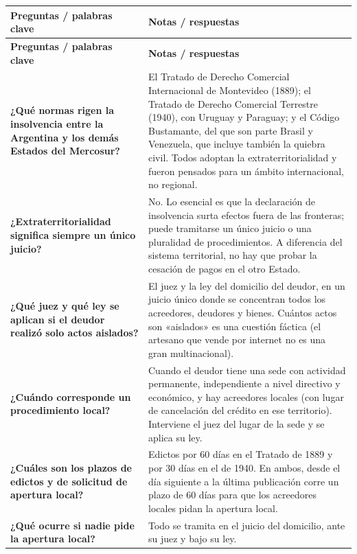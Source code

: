 \documentclass[12pt,oneside]{book}
\begin{document}
\begin{longtable}{>{\raggedright\arraybackslash}p{} >{\raggedright\arraybackslash}p{}}
\toprule
\textbf{Preguntas / palabras clave} & \textbf{Notas / respuestas} \\
\midrule
\endfirsthead
\toprule
\textbf{Preguntas / palabras clave} & \textbf{Notas / respuestas} \\
\midrule
\endhead
\bottomrule
\endlastfoot

\textbf{¿Qué normas rigen la insolvencia entre la Argentina y los demás Estados del Mercosur?} &
El Tratado de Derecho Comercial Internacional de Montevideo (1889); el Tratado de Derecho Comercial Terrestre (1940), con Uruguay y Paraguay; y el Código Bustamante, del que son parte Brasil y Venezuela, que incluye también la quiebra civil. Todos adoptan la extraterritorialidad y fueron pensados para un ámbito internacional, no regional. \\

\textbf{¿Extraterritorialidad significa siempre un único juicio?} &
No. Lo esencial es que la declaración de insolvencia surta efectos fuera de las fronteras; puede tramitarse un único juicio o una pluralidad de procedimientos. A diferencia del sistema territorial, no hay que probar la cesación de pagos en el otro Estado. \\

\textbf{¿Qué juez y qué ley se aplican si el deudor realizó solo actos aislados?} &
El juez y la ley del domicilio del deudor, en un juicio único donde se concentran todos los acreedores, deudores y bienes. Cuántos actos son «aislados» es una cuestión fáctica (el artesano que vende por internet no es una gran multinacional). \\

\textbf{¿Cuándo corresponde un procedimiento local?} &
Cuando el deudor tiene una sede con actividad permanente, independiente a nivel directivo y económico, y hay acreedores locales (con lugar de cancelación del crédito en ese territorio). Interviene el juez del lugar de la sede y se aplica su ley. \\

\textbf{¿Cuáles son los plazos de edictos y de solicitud de apertura local?} &
Edictos por 60 días en el Tratado de 1889 y por 30 días en el de 1940. En ambos, desde el día siguiente a la última publicación corre un plazo de 60 días para que los acreedores locales pidan la apertura local. \\

\textbf{¿Qué ocurre si nadie pide la apertura local?} &
Todo se tramita en el juicio del domicilio, ante su juez y bajo su ley. \\


\end{longtable}
\end{document}
